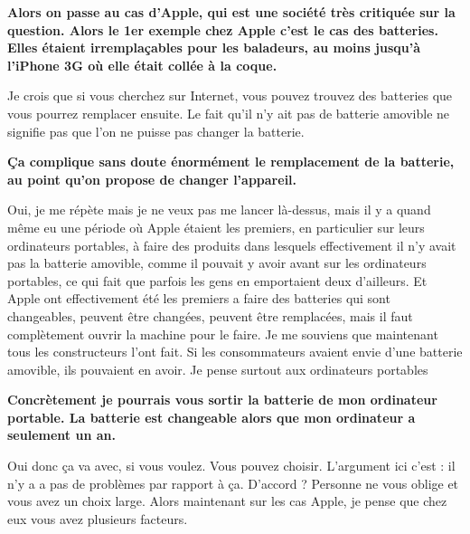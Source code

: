 \begin{small}


\textbf{Alors on passe au cas d'Apple, qui est une société très critiquée sur la question. Alors le 1er exemple chez Apple c'est le cas des batteries. Elles étaient irremplaçables pour les baladeurs, au moins jusqu’à l'iPhone 3G où elle était collée à la coque.}
\smallbreak


Je crois que si vous cherchez sur Internet, vous pouvez trouvez des batteries que vous pourrez remplacer ensuite. Le fait qu'il n'y ait pas de batterie amovible ne signifie pas que l'on ne puisse pas changer la batterie. 

\textbf{Ça complique sans doute énormément le remplacement de la batterie, au point qu'on propose de changer l'appareil.}
\smallbreak


Oui, je me répète mais je ne veux pas me lancer là-dessus, mais il y a quand même eu une période où Apple étaient les premiers, en particulier sur leurs ordinateurs portables, à faire des produits dans lesquels effectivement il n'y avait pas la batterie amovible, comme il pouvait y avoir avant sur les ordinateurs portables, ce qui fait que parfois les gens en emportaient deux d'ailleurs. Et Apple ont effectivement été les premiers a faire des batteries qui sont changeables, peuvent être changées, peuvent être remplacées, mais il faut complètement ouvrir la machine pour le faire. Je me souviens que maintenant tous les constructeurs l'ont fait. Si les consommateurs avaient envie d'une batterie amovible, ils pouvaient en avoir. Je pense surtout aux ordinateurs portables

\textbf{Concrètement je pourrais vous sortir la batterie de mon ordinateur portable. La batterie est changeable alors que mon ordinateur a seulement un an.}
\smallbreak


Oui donc ça va avec, si vous voulez. Vous pouvez choisir. L'argument ici c'est : il n'y a a pas de problèmes par rapport à ça. D'accord ? Personne ne vous oblige et vous avez un choix large. Alors maintenant sur les cas Apple, je pense que chez eux vous avez plusieurs facteurs.


\end{small}
